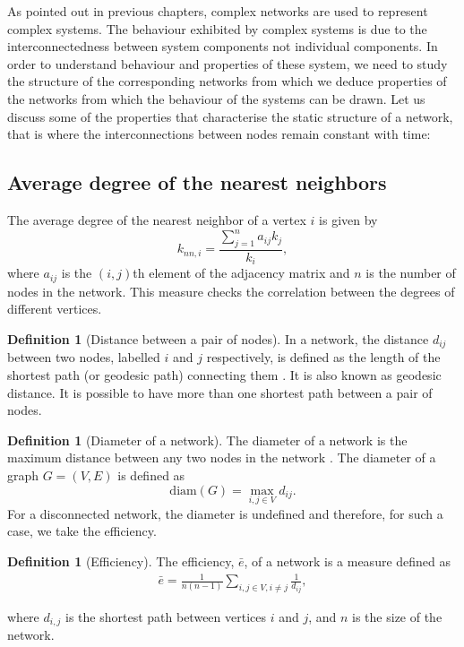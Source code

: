 \documentclass[10pt,a4paper]{article}
\theoremstyle{plain}
\theoremstyle{definition}
\newtheorem{defn}[subsection]{Definition}
\begin{document}
As pointed out in previous chapters, complex networks are used to represent complex systems. The behaviour exhibited by complex systems is due to the interconnectedness between system components not individual components. In order to understand behaviour and properties of these system, we need to study the structure of the corresponding networks from which we deduce properties of the networks from which the behaviour of the systems can be drawn. Let us discuss some of the properties that characterise the static structure of a network, that is where the interconnections between nodes remain constant with time:

\subsection{Average degree of the nearest neighbors}
The average degree of the nearest neighbor of a vertex $i$ is given by
\begin{equation}
k_{nn,i} = \frac{\sum_{j=1}^{n} a_{ij} k_j}{k_i},
\end{equation}
where $a_{ij}$ is the $(i,j)$th element of the adjacency matrix and $n$ is the number of nodes in the network.
This measure checks the correlation between the degrees of different vertices.

\begin{defn}[Distance between a pair of nodes]
	In a network, the distance $d_{ij}$ between two nodes, labelled $i$ and $j$ respectively, is defined as the length of the shortest path (or geodesic path) connecting them \citep{wang2003complex}. It is also known as geodesic distance. It is possible to have more than one shortest path between a pair of nodes.\\
\end{defn}

\begin{defn}[Diameter of a network]
	The diameter of a network is the maximum distance between any two
	nodes in the network \citep{wang2003complex}. The diameter of a graph $G= (V,E )$ is defined as \[ \text{diam}(G ) = \max_{i,j \in V} d_{ij}.\] For a disconnected network, the diameter is undefined and therefore, for such a case, we take the efficiency.
\end{defn}	

\begin{defn}[Efficiency]
	The efficiency, $\bar{e}$, of a network is a measure defined as
	\begin{eqnarray*}
		\bar{e} =\frac{1}{n(n-1)} \sum_{i,j \in V,i\neq j} \frac{1}{d_{ij}},
		\label{eqn:eff}
	\end{eqnarray*}
\end{defn}
where $d_{i,j}$ is the shortest path between vertices $i$ and $j$, and $n$ is the size of the network.
\end{document}
